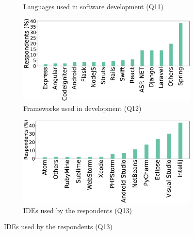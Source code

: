 \begin{figure}[t]
\begin{subfigure}{0.45\textwidth}
          \caption{Languages used in software development (Q11)}
          \label{fig:languages}
    \end{subfigure}
    \begin{subfigure}{0.45\textwidth}
          \includegraphics[scale=0.10]{Figures/Respondents_frameworks}
          \caption{Frameworks used in development (Q12)}
          \label{fig:frameworks}
    \end{subfigure}
    \begin{subfigure}{0.5\textwidth}
          \includegraphics[scale=0.12]{Figures/Respondents_IDEs}
          \caption{IDEs used by the respondents (Q13)}
          \label{fig:IDEs}
    \end{subfigure}
\end{figure}


